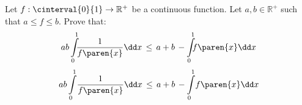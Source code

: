 Let $f : \cinterval{0}{1} \to \mathbb{R}^{+}$ be a continuous function.
Let $a, b \in \mathbb{R}^{+}$ such that $a \leq f \leq b$.
Prove that:
\ifluatex
  \begin{equation*}
    a b \int\limits_{0}^{1} {\mspace{-9mu} \frac{1}{f \paren{x}} \dd x}
    \, \leq \,
    a + b \, - \int\limits_{0}^{1} {\mspace{-9mu} f \paren{x} \dd x}
  \end{equation*}
\else
  \begin{equation*}
    a b \int\limits_{0}^{1} {\mspace{-3mu} \frac{1}{f \paren{x}} \dd x}
    \, \leq \,
    a + b \, - \int\limits_{0}^{1} {\mspace{-3mu} f \paren{x} \dd x}
  \end{equation*}
\fi
